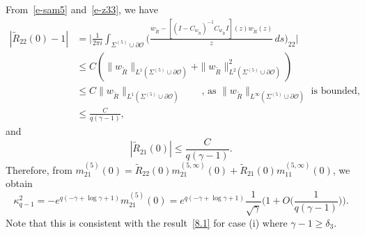 \documentclass{amsart}
\theoremstyle{definition}
\theoremstyle{remark}
\numberwithin{equation}{section}
\newcommand{\wt}{\widetilde}
\begin{document}
From~\eqref{e-sam5} and~\eqref{e-z33}, we have 
\begin{equation*}
  \begin{split}
    |\wt{R}_{22}(0) -1| &= \biggl| \frac1{2\pi i} 
\int_{\Sigma^{(5)}\cup\partial\mathcal{O}} \biggl( 
\frac{w_{\wt{R}}-[(I-C_{w_{\wt{R}}})^{-1}C_{w_{\wt{R}}}I](z)
w_{\wt{R}}(z)}{z}\,ds 
\biggr)_{22} \biggr|\\
    &\le C(\|w_{\wt{R}}\|_{L^1(\Sigma^{(5)}\cup\partial\mathcal{O})}+
\|w_{\wt{R}}\|^2_{L^2(\Sigma^{(5)}\cup\partial\mathcal{O})}) \\
    &\le C\|w_{\wt{R}}\|_{L^1(\Sigma^{(5)}\cup\partial\mathcal{O})} 
\qquad\text{, as $\|w_{\wt{R}}\|
_{L^\infty(\Sigma^{(5)}\cup\partial\mathcal{O})}$ is bounded,}\\
    &\le\frac{C}{q(\gamma-1)},
  \end{split}
\end{equation*}
and 
\begin{equation*}
 |\wt{R}_{21}(0)| \le \frac{C}{q(\gamma-1)}.
\end{equation*}
Therefore, from $m^{(5)}_{21}(0)=\wt{R}_{22}(0)m^{(5,\infty)}_{21}(0)+
\wt{R}_{21}(0)m^{(5,\infty)}_{11}(0)$, we obtain 
\begin{equation}
  \kappa^2_{q-1}
=-e^{q(-\gamma+\log \gamma+1)}m^{(5)}_{21}(0)
=e^{q(-\gamma+\log \gamma+1)} \frac1{\sqrt{\gamma}} 
\biggl(1+O\bigl( \frac1{q(\gamma-1)} \bigr)\biggr).
\end{equation}
Note that this is consistent with the result~\eqref{8.1} for case (i) 
where $\gamma-1\geq \delta_3$.
\end{document}
